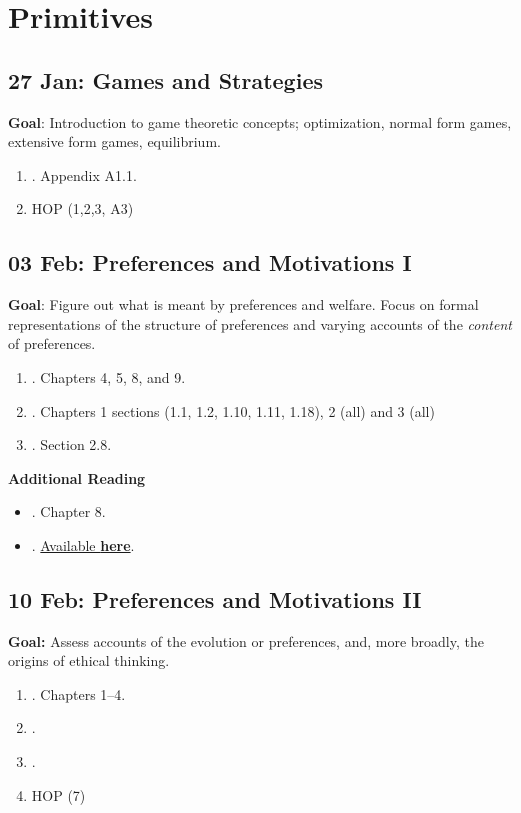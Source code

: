 \documentclass[11pt]{article}
\begin{document}
\section{Primitives}
\subsection{27 Jan: Games and Strategies}
\textbf{Goal}: Introduction to game theoretic concepts; optimization, normal form games, extensive form games, equilibrium.
\begin{enumerate}
\item {}. Appendix A1.1.
\item HOP (1,2,3, A3)
\end{enumerate}


\subsection{03 Feb: Preferences and Motivations I}
\textbf{Goal}: Figure out what is meant by preferences and welfare. Focus on formal representations of the structure of preferences and varying accounts of the \textit{content} of preferences.  
\begin{enumerate}
\item {}. Chapters 4, 5, 8, and 9.
\item {}. Chapters 1 sections (1.1, 1.2, 1.10, 1.11, 1.18), 2 (all) and 3 (all)
\item {}. Section 2.8.

\end{enumerate}

\textbf{Additional Reading}
\begin{itemize}
\item {}. Chapter 8. 
\item {}. \href{<http://ebooks.cambridge.org/chapter.jsf?bid=CBO9781139172387&cid=CBO9781139172387A009>}{Available \textbf{here}}.
\end{itemize}


\subsection{10 Feb: Preferences and Motivations II}
\textbf{Goal:} Assess accounts of the evolution or preferences, and, more broadly, the origins of ethical thinking. 
\begin{enumerate}
\item {}. Chapters 1--4.
\item {}.
\item {}.
\item HOP (7) 
\end{enumerate}
\end{document}
